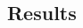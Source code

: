 \documentclass[10pt, letterpaper]{article}
\begin{document}
\begin{spacing}{1.4}

\section*{\large \bf Results}










\end{spacing}
\end{document}
